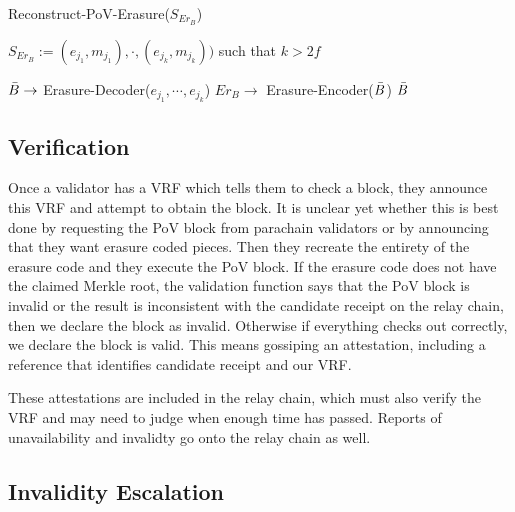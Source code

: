 \begin{algorithm}
  \caption[Reconstruct-PoV-Erasure]{\sc Reconstruct-PoV-Erasure($S_{Er_B}$)}
  \label{algo-reconstruct-pov-erasure}
  \begin{algorithmic}[1]
  \Require
    $S_{Er_B} := {(e_{j_1}, m_{j_1}),\cdot,(e_{j_k}, m_{j_k}))}$ such that $k > 2f$
    
    \State $\bar{B} \rightarrow$ {\sc Erasure-Decoder}(${e_{j_1},\cdots, e_{j_k}}$)
        \State \Return
    \EndIf
    \State $Er_B \rightarrow$ {\sc Erasure-Encoder}($\bar{B}$)
      \State \Return
    \EndIf
    \State \Return $\bar{B}$
  \end{algorithmic}
\end{algorithm}

\subsection{Verification}

Once a validator has a VRF which tells them to check a block, they announce this VRF and attempt to obtain the block. 
It is unclear yet whether this is best done by requesting the PoV block from parachain validators or by announcing that they want erasure coded pieces. 
Then they recreate the entirety of the erasure code and they execute the PoV block. 
If the erasure code does not have the claimed Merkle root, the validation function says that the PoV block is invalid or the result is inconsistent with the candidate receipt on the relay chain, then we declare the block as invalid. 
Otherwise if everything checks out correctly, we declare the block is valid. This means gossiping an attestation, including a reference that identifies candidate receipt and our VRF. 

These attestations are included in the relay chain, which must also verify the VRF and may need to judge when enough time has passed. Reports of unavailability and invalidty go onto the relay chain as well.

\subsection{Invalidity Escalation}\label{escalation}

